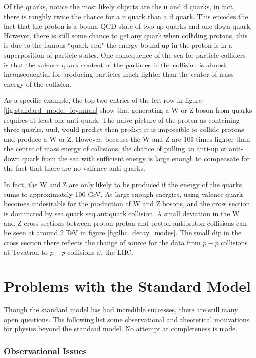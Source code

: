     Of the quarks, notice the most likely objects are the u and d quarks, in fact, there is roughly twice the chance for a u quark than a d quark. This encodes the fact that the proton is a bound QCD state of two up quarks and one down quark. However, there is still some chance to get any quark when colliding protons, this is due to the famous ``quark sea;" the energy bound up in the proton is in a superposition of particle states. One consequence of the sea for particle colliders is that the valence quark content of the particles in the collision is almost inconsequential for producing particles much lighter than the center of mass energy of the collision. 

    As a specific example, the top two entries of the left row in figure \ref{fig:standard_model_feynman} show that generating a W or Z boson from quarks requires at least one anti-quark. The naive picture of the proton as containing three quarks, uud, would predict then predict it is impossible to collide protons and produce a W or Z. However, because the W and Z are 100 times lighter than the center of mass energy of collisions, the chance of pulling an anti-up or anti-down quark from the sea with sufficient energy is large enough to compensate for the fact that there are no valiance anti-quarks. 

    In fact, the W and Z are only likely to be produced if the energy of the quarks sums to approximately 100 GeV. At large enough energies, using valence quark becomes undesirable for the production of W and Z bosons, and the cross section is dominated by sea quark seq antiquark collision. A small deviation in the W and Z cross sections between proton-proton and proton-antiproton collisions can be seen at around 2 TeV in figure \ref{fig:lhc_decay_modes}. The small dip in the cross section there reflects the change of source for the data from $p-\bar{p}$ collisions at Tevatron to $p-p$ collisions at the LHC.

\section{Problems with the Standard Model} \label{sec:problems_with_sm}
  Though the standard model has had incredible successes, there are still many open questions. The following list some observational and theoretical motivations for physics beyond the standard model. No attempt at completeness is made.

  \subsubsection{Observational Issues}

